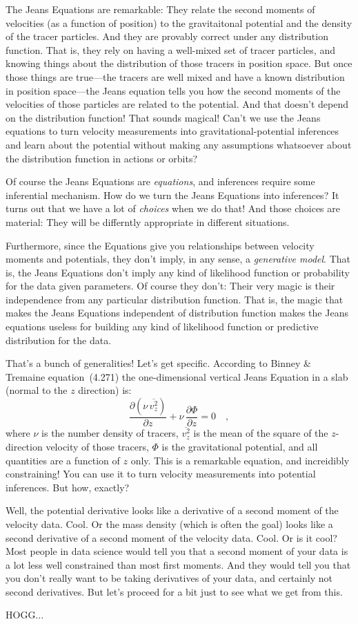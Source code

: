 \documentclass[12pt,letterpaper]{article}
\newcommand{\equationname}{equation}
\begin{document}
The Jeans Equations are remarkable: They relate the second moments of
velocities (as a function of position) to the gravitaitonal potential
and the density of the tracer particles.
And they are provably correct under any distribution function.
That is, they rely on having a well-mixed set of tracer particles,
and knowing things about the distribution of those tracers in position space.
But once those things are true---the tracers are well mixed and have a known
distribution in position space---the Jeans equation tells you how the second
moments of the velocities of those particles are related to the potential.
And that doesn't depend on the distribution function!
That sounds magical!
Can't we use the Jeans equations to turn velocity measurements into
gravitational-potential inferences and learn about the potential without
making any assumptions whatsoever about the distribution function in
actions or orbits?

Of course the Jeans Equations are \emph{equations}, and inferences require
some inferential mechanism.
How do we turn the Jeans Equations into inferences?
It turns out that we have a lot of \emph{choices} when we do that!
And those choices are material: They will be differntly appropriate in
different situations.

Furthermore, since the Equations give you relationships between velocity moments
and potentials, they don't imply, in any sense, a \emph{generative model}.
That is, the Jeans Equations don't imply any kind of likelihood function or
probability for the data given parameters.
Of course they don't: Their very magic is their independence from any particular
distribution function.
That is, the magic that makes the Jeans Equations independent of distribution
function makes the Jeans equations useless for building any kind of likelihood
function or predictive distribution for the data.

That's a bunch of generalities! Let's get specific.
According to Binney \& Tremaine \equationname~(4.271) the one-dimensional vertical
Jeans Equation in a slab (normal to the $z$ direction) is:
\begin{equation}
\frac{\partial(\nu\,\overline{v_z^2})}{\partial z} + \nu\,\frac{\partial\Phi}{\partial z} = 0
\quad ,
\end{equation}
where
$\nu$ is the number density of tracers,
$\overline{v_z^2}$ is the mean of the square of the $z$-direction velocity of those tracers,
$\Phi$ is the gravitational potential,
and all quantities are a function of $z$ only.
This is a remarkable equation, and increidibly constraining!
You can use it to turn velocity measurements into potential inferences.
But how, exactly?

Well, the potential derivative looks like a derivative of a second
moment of the velocity data.
Cool.
Or the mass density (which is often the goal) looks like a second
derivative of a second moment of the velocity data.
Cool.
Or is it cool?
Most people in data science would tell you that a second moment of
your data is a lot less well constrained than most first moments.
And they would tell you that you don't really want to be taking
derivatives of your data, and certainly not second derivatives.
But let's proceed for a bit just to see what we get from this.

HOGG...
\end{document}
